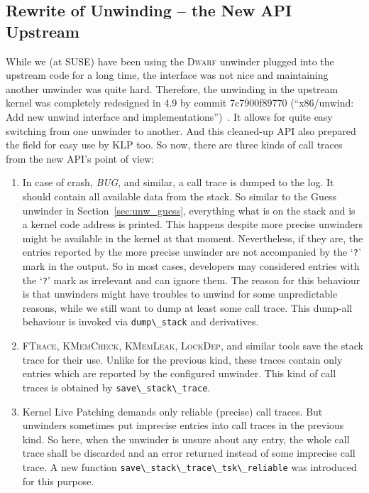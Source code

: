 \documentclass[10pt]{llncs}
\newcommand{\code}[2][]{\lstinline[columns=fullflexible, #1]$#2$}
\newcommand{\commit}[1][]{\texttt{#1}}
\newcommand{\dwarf}{\textsc{Dwarf}\xspace}
\begin{document}
\subsection{Rewrite of Unwinding -- the New API Upstream} \label{sec:rewrite}
While we (at SUSE) have been using the \dwarf unwinder plugged into the
upstream code for a long time, the interface was not nice and maintaining
another unwinder was quite hard. Therefore, the unwinding in the upstream
kernel was completely redesigned in 4.9 by commit \commit{7c7900f89770}
(``x86/unwind: Add new unwind interface and
implementations'')~\cite{git_unw_rewrite}. It allows for quite easy switching
from one unwinder to another. And this cleaned-up API also prepared the field
for easy use by KLP too. So now, there are three kinds of call traces from the
new API's point of view:
\begin{enumerate}
  \item In case of crash, \textit{BUG}, and similar, a call trace is dumped to
    the log. It should contain all available data from the stack. So similar
    to the Guess unwinder in Section~\ref{sec:unw_guess}, everything what is
    on the stack and is a kernel code address is printed.  This happens
    despite more precise unwinders might be available in the kernel at that
    moment. Nevertheless, if they are, the entries reported by the more
    precise unwinder are not accompanied by the `\code{?}' mark in the output.
    So in most cases, developers may considered entries with the `\code{?}'
    mark as irrelevant and can ignore them.  The reason for this behaviour is
    that unwinders might have troubles to unwind for some unpredictable
    reasons, while we still want to dump at least some call trace. This
    dump-all behaviour is invoked via \code{dump\_stack} and derivatives.
  \item \textsc{FTrace}, \textsc{KMemCheck}, \textsc{KMemLeak},
    \textsc{LockDep}, and similar tools save the stack trace for their use.
    Unlike for the previous kind, these traces contain only entries which are
    reported by the configured unwinder.  This kind of call traces is obtained
    by \code{save\_stack\_trace}.
  \item Kernel Live Patching demands only reliable (precise) call traces.  But
    unwinders sometimes put imprecise entries into call traces in the previous
    kind. So here, when the unwinder is unsure about any entry, the whole call
    trace shall be discarded and an error returned instead of some imprecise
    call trace.  A new function \code{save\_stack\_trace\_tsk\_reliable} was
    introduced for this purpose.
\end{enumerate}
\end{document}
